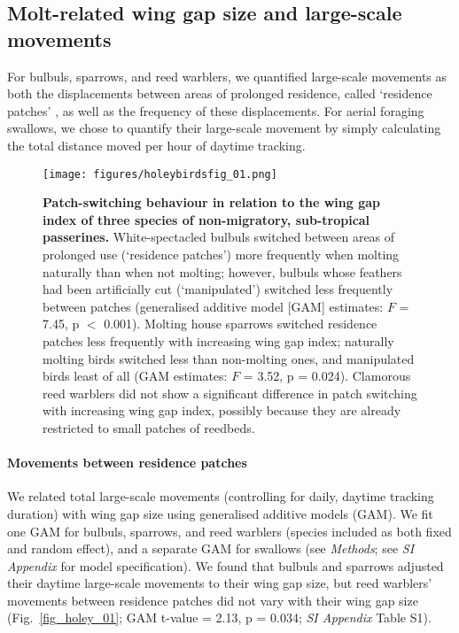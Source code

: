 \begin{refsection}
\subsection*{Molt-related wing gap size and large-scale movements}

For bulbuls, sparrows, and reed warblers, we quantified large-scale movements as both the displacements between areas of prolonged residence, called `residence patches' \cite{gupte2022d}, as well as the frequency of these displacements.
For aerial foraging swallows, we chose to quantify their large-scale movement by simply calculating the total distance moved per hour of daytime tracking.

\begin{figure}%
    \centering
    \texttt{[image: figures/holeybirdsfig\_01.png]}
    \caption{
        \textbf{Patch-switching behaviour in relation to the wing gap index of three species of non-migratory, sub-tropical passerines.}
        White-spectacled bulbuls switched between areas of prolonged use (`residence patches') more frequently when molting naturally than when not molting; however, bulbuls whose feathers had been artificially cut (`manipulated') switched less frequently between patches (generalised additive model [GAM] estimates: $F$ = 7.45, p $<$ 0.001).
        Molting house sparrows switched residence patches less frequently with increasing wing gap index; naturally molting birds switched less than non-molting ones, and manipulated birds least of all (GAM estimates: $F$ = 3.52, p = 0.024).
        Clamorous reed warblers did not show a significant difference in patch switching with increasing wing gap index, possibly because they are already restricted to small patches of reedbeds.
    }\label{fig_holey_02}
\end{figure}

\paragraph*{Movements between residence patches}

We related total large-scale movements (controlling for daily, daytime tracking duration) with wing gap size using generalised additive models (GAM).
We fit one GAM for bulbuls, sparrows, and reed warblers (species included as both fixed and random effect), and a separate GAM for swallows (see \textit{Methods}; see \textit{SI Appendix} for model specification).
We found that bulbuls and sparrows adjusted their daytime large-scale movements to their wing gap size, but reed warblers' movements between residence patches did not vary with their wing gap size (Fig.~\ref{fig_holey_01}; GAM t-value = 2.13, p = 0.034; \textit{SI Appendix} Table S1).


\end{refsection}
